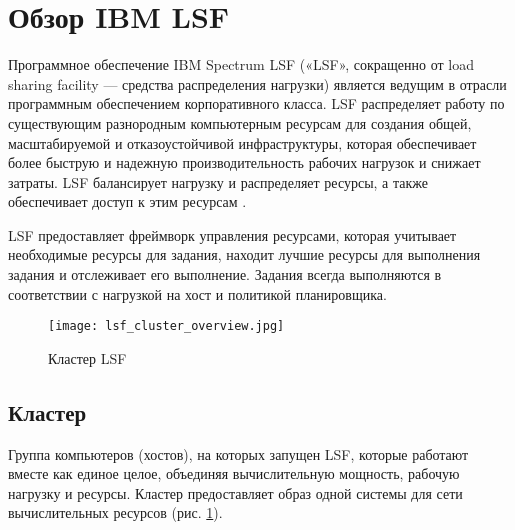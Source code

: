 \section{Обзор IBM LSF} 

Программное обеспечение IBM Spectrum LSF («LSF», сокращенно от load sharing facility --- средства распределения нагрузки) является ведущим в отрасли программным обеспечением корпоративного класса. LSF распределяет работу по существующим разнородным компьютерным ресурсам для создания общей, масштабируемой и отказоустойчивой инфраструктуры, которая обеспечивает более быструю и надежную производительность рабочих нагрузок и снижает затраты. LSF балансирует нагрузку и распределяет ресурсы, а также обеспечивает доступ к этим ресурсам \cite{lsf_overview}. 

LSF предоставляет фреймворк управления ресурсами, которая учитывает необходимые ресурсы для задания, находит лучшие ресурсы для выполнения задания и отслеживает его выполнение. Задания всегда выполняются в соответствии с нагрузкой на хост и политикой планировщика.

\begin{figure}[h]
    \centering
    \texttt{[image: lsf\_cluster\_overview.jpg]}
    \caption{Кластер LSF}
    \label{fig:LSF_cluster}
\end{figure}

\subsection{Кластер}

Группа компьютеров (хостов), на которых запущен LSF, которые работают вместе как единое целое, объединяя вычислительную мощность, рабочую нагрузку и ресурсы. Кластер предоставляет образ одной системы для сети вычислительных ресурсов (рис. \ref{fig:LSF_cluster}).

